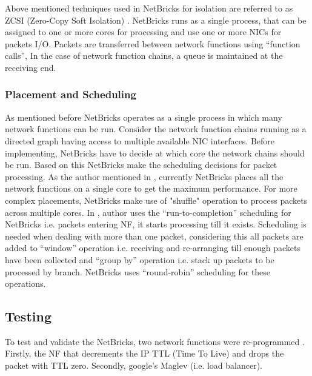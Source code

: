 \documentclass[10pt, a4paper, conference]{IEEEtran}
\begin{document}
Above mentioned techniques used in NetBricks for isolation are referred to as ZCSI (Zero-Copy Soft Isolation) \cite{Panda2016}. NetBricks runs as a single process, that can be assigned to one or more cores for processing and use one or more NICs for packets I/O. Packets are transferred between network functions using “function calls”, In the case of network function chains, a queue is maintained at the receiving end.
\subsubsection*{Placement and Scheduling}
As mentioned before NetBricks operates as a single process in which many network functions can be run. Consider the network function chains running as a directed graph having access to multiple available NIC interfaces. Before implementing, NetBricks have to decide at which core the network chains should be run. Based on this NetBricks make the scheduling decisions for packet processing. As the author mentioned in \cite{Panda2016}, currently NetBricks places all the network functions on a single core to get the maximum performance. For more complex placements, NetBricks make use of "shuffle" operation to process packets across multiple cores. 
In \cite{Panda2016}, author uses the “run-to-completion” scheduling for NetBricks i.e. packets entering NF, it starts processing till it exists. Scheduling is needed when dealing with more than one packet, considering this all packets are added to  “window” operation i.e. receiving and re-arranging till enough packets have been collected and “group by” operation i.e. stack up packets to be processed by branch. NetBricks uses “round-robin” scheduling for these operations. 
\subsection{Testing}
To test and validate the NetBricks, two network functions were re-programmed \cite{Panda2016}. Firstly, the NF that decrements the IP TTL (Time To Live) and drops the packet with TTL zero. Secondly, google’s Maglev\cite{Yaghoubi2012} (i.e. load balancer).
 
\end{document}

